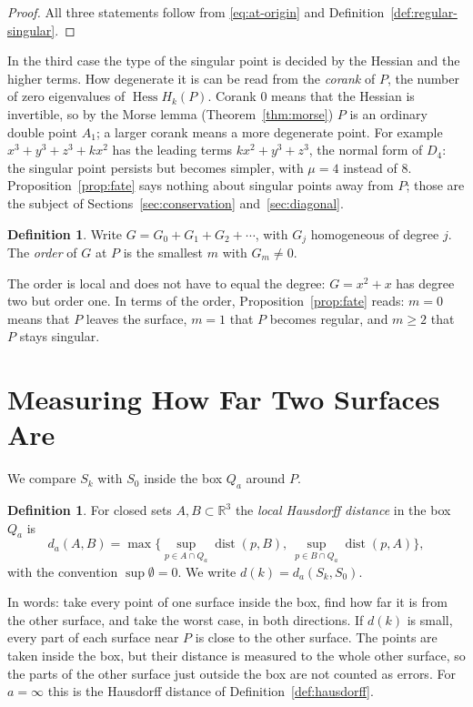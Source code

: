 \documentclass[12pt, a4paper, oneside]{book}
\theoremstyle{plain}
\theoremstyle{definition}
\newtheorem{definition}[theorem]{Definition}
\theoremstyle{remark}
\theoremstyle{definition}
\begin{document}
\begin{proof}
All three statements follow from \eqref{eq:at-origin} and Definition~\ref{def:regular-singular}.
\end{proof}

In the third case the type of the singular point is decided by the Hessian and the higher terms. How degenerate it is can be read from the \emph{corank} of $P$, the number of zero eigenvalues of $\operatorname{Hess}H_k(P)$. Corank $0$ means that the Hessian is invertible, so by the Morse lemma (Theorem~\ref{thm:morse}) $P$ is an ordinary double point $A_1$; a larger corank means a more degenerate point. For example $x^3+y^3+z^3+kx^2$ has the leading terms $kx^2+y^3+z^3$, the normal form of $D_4$: the singular point persists but becomes simpler, with $\mu=4$ instead of $8$. Proposition~\ref{prop:fate} says nothing about singular points away from $P$; those are the subject of Sections~\ref{sec:conservation} and~\ref{sec:diagonal}.

\begin{definition}
\label{def:order}
Write $G=G_0+G_1+G_2+\cdots$, with $G_j$ homogeneous of degree $j$. The \emph{order} of $G$ at $P$ is the smallest $m$ with $G_m\neq0$.
\end{definition}

The order is local and does not have to equal the degree: $G=x^2+x$ has degree two but order one. In terms of the order, Proposition~\ref{prop:fate} reads: $m=0$ means that $P$ leaves the surface, $m=1$ that $P$ becomes regular, and $m\ge2$ that $P$ stays singular.

\section{Measuring How Far Two Surfaces Are}
\label{sec:convergence}

We compare $S_k$ with $S_0$ inside the box $Q_a$ around $P$.

\begin{definition}
\label{def:local-hausdorff}
For closed sets $A,B\subset\mathbb{R}^3$ the \emph{local Hausdorff distance} in the box $Q_a$ is
\[
d_a(A,B)=\max\Big\{\sup_{p\in A\cap Q_a}\operatorname{dist}(p,B),\ \sup_{p\in B\cap Q_a}\operatorname{dist}(p,A)\Big\},
\]
with the convention $\sup\emptyset=0$. We write $d(k)=d_a(S_k,S_0)$.
\end{definition}

In words: take every point of one surface inside the box, find how far it is from the other surface, and take the worst case, in both directions. If $d(k)$ is small, every part of each surface near $P$ is close to the other surface. The points are taken inside the box, but their distance is measured to the whole other surface, so the parts of the other surface just outside the box are not counted as errors. For $a=\infty$ this is the Hausdorff distance of Definition~\ref{def:hausdorff}.
\end{document}
